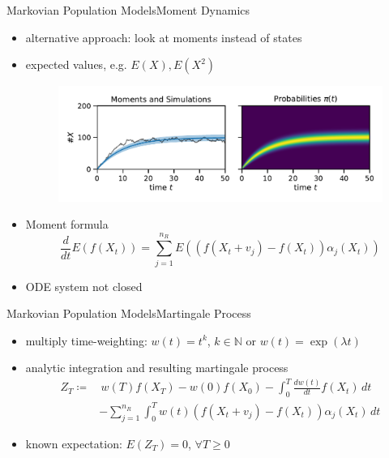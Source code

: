 \documentclass{beamer}
\newcommand{\expSym}{{E}}
\newcommand{\E}[1]{\ensuremath{\expSym\left(#1\right)}}
\renewcommand{\vec}[1]{\ensuremath{#1}}
\begin{document}
\begin{frame}{Markovian Population Models}{Moment Dynamics}
  \begin{itemize}
    \item alternative approach: look at moments instead of states
    \item expected values, e.g. $\E{X}, \E{X^2}$
    \begin{figure}
        \centering
    \includegraphics[scale=.4]{../gfx/momsandprobs.pdf}
    \end{figure}
    \item Moment formula
        \begin{equation*}
            \frac{d}{dt}\E{f({\vec{ X}}_t)} = \sum_{j=1}^{n_R}\E{\left(f({\vec X_t +
            \vec{v}_j}) - f(\vec X_t)\right)\alpha_j(\vec X_t)}
        \end{equation*}
    \item ODE system not closed
  \end{itemize}
\end{frame}

\begin{frame}{Markovian Population Models}{Martingale Process}
    \begin{itemize}
    \item multiply time-weighting: $w(t)=t^k$, $k\in\mathbb{N}$ or $w(t)=\exp(\lambda t)$
    \item analytic integration and resulting martingale process
        \begin{equation*}
            \begin{split}
            Z_T\coloneqq&\,w(T)f(\vec X_T) - w(0)f(\vec X_{0}) -
            \int_{0}^T\frac{dw(t)}{dt}f(\vec X_t)\,dt\\
            &-\sum_{j=1}^{n_R}\int_{0}^Tw(t)
                 (f(\vec X_t+\vec v_j) - f(\vec X_t))\alpha_j(\vec X_t)\,dt
         \end{split}
        \end{equation*}
    \item known expectation: $\E{Z_T}=0$, $\forall T\geq 0$
  \end{itemize}
\end{frame}
\end{document}
